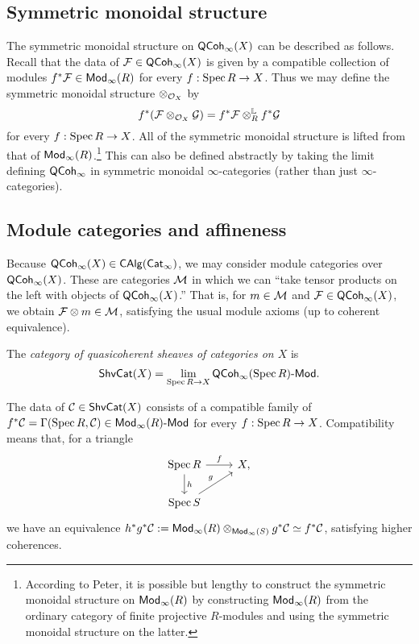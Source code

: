 \documentclass{article}
\begin{document}
\subsection{Symmetric monoidal structure}

The symmetric monoidal structure on $\mathsf{QCoh}_\infty(X)$ can be described as follows.
Recall that the data of $\mathcal{F} \in \mathsf{QCoh}_\infty(X)$ is given by a compatible collection of modules $f^* \mathcal{F} \in \mathsf{Mod}_\infty(R)$ for every $f: \operatorname{Spec} R \to X$.
Thus we may define the symmetric monoidal structure $\otimes_{\mathcal{O}_X}$ by
\[
	f^*(\mathcal{F} \otimes_{\mathcal{O}_X} \mathcal{G}) = f^* \mathcal{F} \otimes_R^{\mathbb{L}} f^* \mathcal{G}
\]
for every $f: \operatorname{Spec} R \to X$.
All of the symmetric monoidal structure is lifted from that of $\mathsf{Mod}_\infty(R)$.\footnote{According to Peter, it is possible but lengthy to construct the symmetric monoidal structure on $\mathsf{Mod}_\infty(R)$ by constructing $\mathsf{Mod}_\infty(R)$ from the ordinary category of finite projective $R$-modules and using the symmetric monoidal structure on the latter.}
This can also be defined abstractly by taking the limit defining $\mathsf{QCoh}_\infty$ in symmetric monoidal $\infty$-categories (rather than just $\infty$-categories).

\subsection{Module categories and affineness}

Because $\mathsf{QCoh}_\infty(X) \in \mathsf{CAlg}(\mathsf{Cat}_\infty)$, we may consider module categories over $\mathsf{QCoh}_\infty(X)$.
These are categories $\mathcal{M}$ in which we can ``take tensor products on the left with objects of $\mathsf{QCoh}_\infty(X)$.''
That is, for $m \in \mathcal{M}$ and $\mathcal{F} \in \mathsf{QCoh}_\infty(X)$, we obtain $\mathcal{F} \otimes m \in \mathcal{M}$, satisfying the usual module axioms (up to coherent equivalence).

\begin{dfn}
	The \emph{category of quasicoherent sheaves of categories on $X$} is
	\[
		\mathsf{ShvCat}(X) = \lim_{\operatorname{Spec} R \to X} \mathsf{QCoh}_\infty(\operatorname{Spec} R)\text{-}\mathsf{Mod}.
	\]
\end{dfn}

The data of $\mathcal{C} \in \mathsf{ShvCat}(X)$ consists of a compatible family of $f^* \mathcal{C} = \Gamma(\operatorname{Spec} R, \mathcal{C}) \in \mathsf{Mod}_\infty(R)\text{-}\mathsf{Mod}$ for every $f: \operatorname{Spec} R \to X$.
Compatibility means that, for a triangle
\[
	\begin{tikzcd}
		\Spec R \rar["f"] \dar["h"] & X, \\
		\Spec S \ar[ur, "g"]
	\end{tikzcd}
\]
we have an equivalence $h^* g^* \mathcal{C} := \mathsf{Mod}_\infty(R) \otimes_{\mathsf{Mod}_\infty(S)} g^* \mathcal{C} \simeq f^* \mathcal{C}$, satisfying higher coherences.
\end{document}
